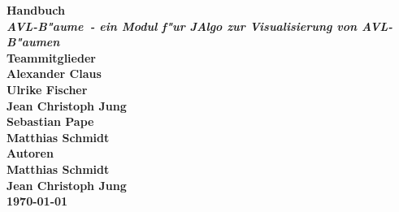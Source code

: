 \documentclass[a4paper,titlepage]{article}
\newcommand{\AVL}{\mbox{{\bf AVL-B"aume}}}
\begin{document}

\begin{center}
	\bigskip
	\bigskip
	\bigskip
	\bigskip
	\Huge \bf Handbuch \rm \\
	{\large {\it \AVL \ - ein Modul f"ur JAlgo zur Visualisierung von AVL-B"aumen}}  \\ 
	\bigskip 
	\bigskip 
	\bigskip 
	\bigskip 
	\bigskip
	\Large \bf Teammitglieder \rm \\
	{\large Alexander Claus \\
	Ulrike Fischer \\
	Jean Christoph Jung \\
	Sebastian Pape \\
	Matthias Schmidt} \\
	\bigskip
	\bigskip
	\bigskip	
	\Large \bf Autoren \rm \\
	{\large Matthias Schmidt \\
	Jean Christoph Jung} \\
	\bigskip
	\bigskip
	\bigskip
	\bigskip
	\bigskip
	{\large \today}
	
	\newpage
\end{center}


\tableofcontents
\newpage





 


\end{document}
